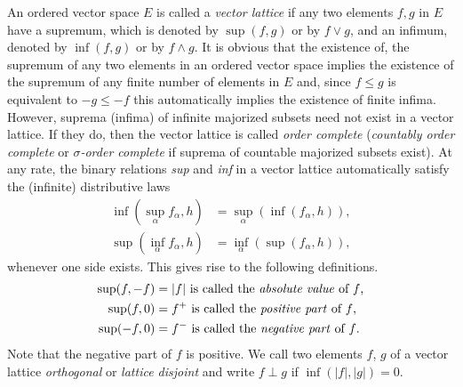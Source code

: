 An ordered vector space $ E $ is called a \emph{vector lattice} if any two elements $ f, g $ in $ E $ have a supremum, which is denoted by $ \sup(f,g) $ or by $ f \vee g $, and an infimum, denoted by $ \inf(f,g) $ or by $ f \wedge g $.
It is obvious that the existence of, \eg the supremum of any two elements in an ordered vector space implies the existence of the supremum of any finite number of elements in $ E $ and, since $ f \leq g $ is equivalent to $ -g \leq -f $ this automatically implies the existence of finite infima.
However, suprema (infima) of infinite majorized subsets need not exist in a vector lattice.
If they do, then the vector lattice is called \emph{order complete} (\emph{countably order complete} or \emph{$ \sigma $-order complete} if suprema of countable majorized subsets exist).
At any rate, the binary relations \emph{sup} and \emph{inf} in a vector lattice automatically satisfy the (infinite) distributive laws
\begin{align*}
\inf(\sup_{\alpha}f_{\alpha},h) & = \sup_{\alpha}(\inf(f_{\alpha},h)), \\
\sup(\inf_{\alpha}f_{\alpha},h) & = \inf_{\alpha}(\sup(f_{\alpha},h)),
\end{align*}
whenever one side exists.
This gives rise to the following definitions.
\begin{align*}
	\sup(f,-f) &= |f| \text{ is called the \emph{absolute value} of $ f $,} \\
	\sup(f,0) &= f^{+} \text{ is called the \emph{positive part} of $ f $,} \\
	\sup(-f,0) &= f^{-} \text{ is called the \emph{negative part} of $ f $.}
\end{align*}
Note that the negative part of $ f $ is positive.
We call two elements $ f $, $ g $ of a vector lattice \emph{orthogonal} or \emph{lattice disjoint} and write $ f \perp g $ if $ \inf(|f|,|g|) = 0 $.

